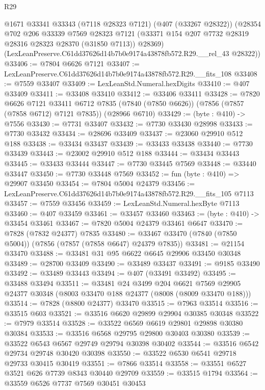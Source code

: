 \begin{lexlean}{R29}
\begin{coremodule}
      @1671
      @33341
      @33343
      (@7118 @28323 @7121)
      (@407 (@33267 @28322))
      (@28354
        @702
        @206
        @33339
        @7569
        @28323
        @7121
        (@33371 @154 @207 @7732 @28319 @28316 @28323 @28370 (@31850 @7113))
        @28369)
      (LexLeanPreserve.C61dd37626d14b7b0e9174a43878fb572.R29.__rel_43 @28322))
@33406 := @7804 @6626 @7121
@33407 := LexLeanPreserve.C61dd37626d14b7b0e9174a43878fb572.R29.__fits_108
@33408 := @7559 @33407
@33409 := LexLeanStd.Numeral.hexDigits
@33410 := @407 @33409
@33411 := @33408 @33410
@33412 := @33406 @33411
@33428 := @7820
    @6626
    @7121
    @33411
    @6712
    @7835
    (@7840 (@7850 @6626))
    (@7856 (@7857 (@7858 @6712) @7121 @7835))
    (@28966 @6710)
@33429 := (byte : @410) -> @7556
@33430 := @7731 @33407
@33432 := @7730 @33430 @28998
@33433 := @7730 @33432
@33434 := @28696 @33409
@33437 := @23060 @29910 @512 @188
@33438 := @33434 @33437
@33439 := @33433 @33438
@33440 := @7730 @33439
@33443 := @23002 @29910 @512 @188
@33444 := @33434 @33443
@33445 := @33433 @33444
@33447 := @7730 @33445 @7569
@33448 := @33440 @33447
@33450 := @7730 @33448 @7569
@33452 := fun (byte : @410) => @29907 @33450
@33454 := @7804 @5004 @24379
@33456 := LexLeanPreserve.C61dd37626d14b7b0e9174a43878fb572.R29.__fits_105 @7113
@33457 := @7559 @33456
@33459 := LexLeanStd.Numeral.hexByte @7113
@33460 := @407 @33459
@33461 := @33457 @33460
@33463 := (byte : @410) -> @33454 @33461
@33467 := @7820 @5004 @24379 @33461 @6647
@33470 := @7828 (@7832 @24377) @7835
@33480 := @33467 @33470 (@7840 (@7850 @5004)) (@7856 (@7857 (@7858 @6647) @24379 @7835))
@33481 := @21154 @33470
@33488 := @33481 @31 @95 @6622 @6645 @29906 @33450 @30348
@33489 := @28700 @33409
@33490 := @33489 @33437
@33491 := @9185 @33490
@33492 := @33489 @33443
@33494 := @407 (@33491 @33492)
@33495 := @33488 @33494
@33511 := @33481
    @24
    @3499
    @204
    @6621
    @7569
    @29905
    @24377
    @30348
    (@8003 @33470 @188 @24377 (@8008 (@8009 @33470 @188)))
@33514 := @7828 (@8800 @24377) @33470
@33515 := @7963 @33514
@33516 := @33515 @603
@33521 := @33516 @6620 @29899 @29904 @30385 @30348
@33522 := @7979 @33514
@33528 := @33522 @6569 @6619 @29801 @29898 @30380 @30384
@33533 := @33516 @6568 @29795 @29800 @30403 @30380
@33539 := @33522 @6543 @6567 @29749 @29794 @30398 @30402
@33544 := @33516 @6542 @29734 @29748 @30420 @30398
@33550 := @33522 @6530 @6541 @29718 @29733 @30415 @30419
@33551 := @7866 @33514
@33558 := @33551 @6527 @3521 @626 @7739 @8343 @30440 @29709
@33559 := @33515 @1794
@33564 := @33559 @6526 @7737 @7569 @30451 @30453

\end{coremodule}
\end{lexlean}
